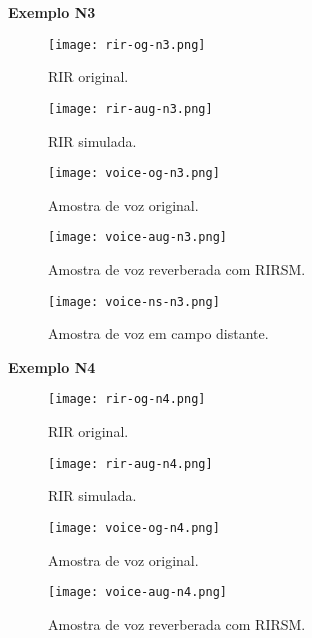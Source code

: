 \pagebreak
{\Large \textbf{Exemplo N3}}

\begin{figure} [H]
    \centering
    \texttt{[image: rir-og-n3.png]}
    \caption{RIR original.}
    \label{fig-a:rir-og-n3}
\end{figure} 

\begin{figure} [H]
    \centering
    \texttt{[image: rir-aug-n3.png]}
    \caption{RIR simulada.}
    \label{fig-a:rir-aug-n3}
\end{figure} 

\begin{figure} [H]
    \centering
    \texttt{[image: voice-og-n3.png]}
    \caption{Amostra de voz original.}
    \label{fig-a:voice-og-n3}
\end{figure} 

\begin{figure} [H]
    \centering
    \texttt{[image: voice-aug-n3.png]}
    \caption{Amostra de voz reverberada com RIRSM.}
    \label{fig-a:voice-aug-n3}
\end{figure}

\begin{figure} [H]
    \centering
    \texttt{[image: voice-ns-n3.png]}
    \caption{Amostra de voz em campo distante.}
    \label{fig-a:voice-ns-n3}
\end{figure}

\pagebreak
{\Large \textbf{Exemplo N4}}

\begin{figure} [H]
    \centering
    \texttt{[image: rir-og-n4.png]}
    \caption{RIR original.}
    \label{fig-a:rir-og-n4}
\end{figure} 

\begin{figure} [H]
    \centering
    \texttt{[image: rir-aug-n4.png]}
    \caption{RIR simulada.}
    \label{fig-a:rir-aug-n4}
\end{figure} 

\begin{figure} [H]
    \centering
    \texttt{[image: voice-og-n4.png]}
    \caption{Amostra de voz original.}
    \label{fig-a:voice-og-n4}
\end{figure} 

\begin{figure} [H]
    \centering
    \texttt{[image: voice-aug-n4.png]}
    \caption{Amostra de voz reverberada com RIRSM.}
    \label{fig-a:voice-aug-n4}
\end{figure}

